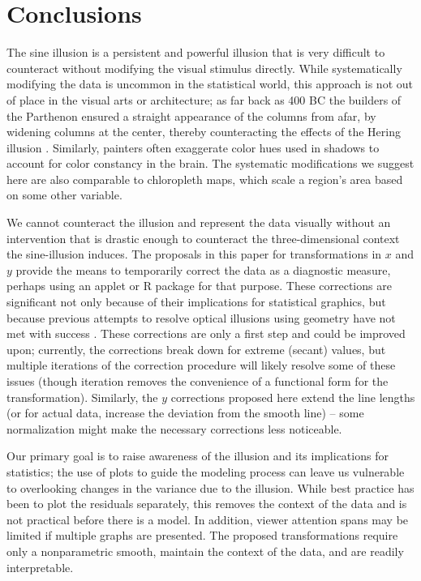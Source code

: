 \documentclass[11pt]{isuthesis}\usepackage[]{graphicx}\usepackage[]{color}
\begin{document}
\section{Conclusions}
The sine illusion is a persistent and powerful illusion that is very difficult to counteract without modifying the visual stimulus directly. While systematically modifying the data is uncommon in the statistical world, this approach is not out of place in the visual arts or architecture; as far back as 400 BC the builders of the Parthenon ensured a straight appearance of the columns from afar, by widening columns at the center, thereby counteracting the effects of the Hering illusion \citep{naturalscenes,hering}. Similarly, painters often exaggerate color hues used in shadows to account for color constancy in the brain. The systematic modifications we suggest here are also comparable to chloropleth maps, which scale a region's area based on some other variable. 

We cannot counteract the illusion and represent the data visually without an intervention that is drastic enough to counteract the three-dimensional context the sine-illusion induces. The proposals in this paper for transformations in $x$ and $y$ provide the means to temporarily correct the data as a diagnostic measure, perhaps using an applet or R package for that purpose. These corrections are significant not only because of their implications for statistical graphics, but because previous attempts to resolve optical illusions using geometry have not met with success \citep{westheimer2008illusions}. These corrections are only a first step and could be improved upon; currently, the corrections break down for extreme (secant) values, but multiple iterations of the correction procedure will likely resolve some of these issues (though iteration removes the convenience of a functional form for the transformation). Similarly, the $y$ corrections proposed here extend the line lengths (or for actual data, increase the deviation from the smooth line) -- some normalization might make the necessary corrections less noticeable. 

Our primary goal is to raise awareness of the illusion and its implications for statistics; the use of plots to guide the modeling process can leave us vulnerable to overlooking changes in the variance due to the illusion. While best practice has  been to plot the residuals separately, this removes the context of the data and is not practical before there is a model. In addition, viewer attention spans may be limited if multiple graphs are presented. The proposed transformations require only a nonparametric smooth, maintain the context of the data, and are readily interpretable. 
\end{document}
